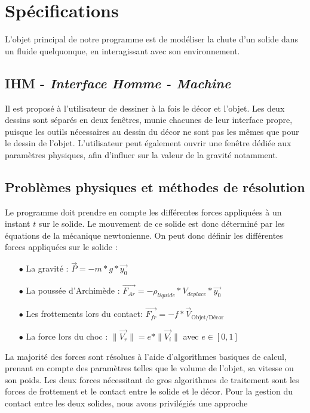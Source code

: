 \section{Spécifications}
L'objet principal de notre programme est de modéliser la chute d'un solide dans un
fluide quelquonque, en interagissant avec son environnement.
\subsection{IHM - \emph{Interface Homme - Machine}}
Il est proposé à l'utilisateur de dessiner à la fois le décor et l'objet.
Les deux dessins sont séparés en deux fenêtres, munie chacunes de leur interface propre,
puisque les outils nécessaires au dessin du décor ne sont pas les mêmes que pour le dessin de l'objet.
L'utilisateur peut également ouvrir une fenêtre dédiée aux paramètres physiques, afin d'influer
sur la valeur de la gravité notamment.
\subsection{Problèmes physiques et méthodes de résolution}
Le programme doit prendre en compte les différentes forces appliquées à 
un instant $t$ sur le solide. Le mouvement de ce solide est donc déterminé
par les équations de la mécanique newtonienne.
On peut donc définir les différentes forces appliquées sur le solide :
\begin{itemize}
\item[$\bullet$] La gravité : \dotfill{} $\overrightarrow{P} = -m*g*\overrightarrow{y_0}$ 
\item[$\bullet$] La poussée d'Archimède : \dotfill{} $\overrightarrow{F_{Ar}} = -\rho_{liquide} * V_{deplace} *\overrightarrow{y_0} $
\item[$\bullet$] Les frottements lors du contact: \dotfill{}$\overrightarrow{F_{fr}} = -f*\overrightarrow{V}_{\text{Objet/Décor}}$
\item[$\bullet$] La force lors du choc : \dotfill{} $ \|\overrightarrow{V_r} \|= e * \| \overrightarrow{V_i} \|$ avec $ e \in [ 0 , 1 ] $\\
\end{itemize}

La majorité des forces sont résolues à l'aide d'algorithmes basiques de
calcul, prenant en compte des paramètres telles que le volume de l'objet,
sa vitesse ou son poids. Les deux forces nécessitant de gros algorithmes
de traitement sont les forces de frottement et le contact entre le solide
et le décor.
Pour la gestion du contact entre les deux solides, nous avons privilégiés
une approche 

